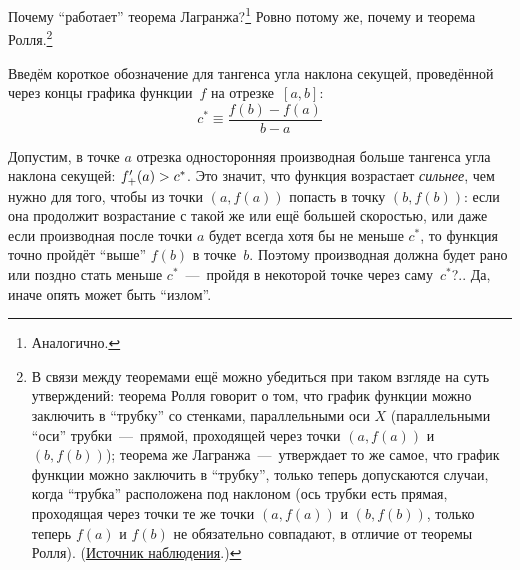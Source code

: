 \documentclass[a4paper,12pt]{article}
\begin{document}
  Почему ``работает'' теорема Лагранжа?\footnote{
    Аналогично.
  }
  Ровно потому же, почему и теорема Ролля.\footnote{
    В связи между теоремами ещё можно убедиться при таком взгляде на суть утверждений: теорема Ролля говорит о том, что график функции можно заключить в ``трубку'' со стенками, параллельными оси $X$ (параллельными ``оси'' трубки~---~прямой, проходящей через точки $(a, f(a))$ и $(b, f(b))$); теорема же Лагранжа~---~утверждает то же самое, что график функции можно заключить в ``трубку'', только теперь допускаются случаи, когда ``трубка'' расположена под наклоном (ось трубки есть прямая, проходящая через точки те же точки $(a, f(a))$ и $(b, f(b))$, только теперь $f(a)$ и $f(b)$ не обязательно совпадают, в отличие от теоремы Ролля).
    (\href{https://math.stackexchange.com/questions/459406/proof-of-the-mean-value-theorem\#comment988873_459406}{Источник наблюдения}.)
  }

  Введём короткое обозначение для тангенса угла наклона секущей, проведённой через концы графика функции~$f$ на отрезке~$[a, b]$:
  \[
    c^* \equiv \frac{f(b) - f(a)}{b - a}
  \]

  Допустим, в точке $a$ отрезка односторонняя производная больше тангенса угла наклона секущей: $f'_+(a) \hm> c^*$.
  Это значит, что функция возрастает \emph{сильнее}, чем нужно для того, чтобы из точки $(a, f(a))$ попасть в точку $(b, f(b))$: если она продолжит возрастание с такой же или ещё большей скоростью, или даже если производная после точки $a$ будет всегда хотя бы не меньше $c^*$, то функция точно пройдёт ``выше'' $f(b)$ в точке~$b$.
  Поэтому производная должна будет рано или поздно стать меньше $c^*$~---~пройдя в некоторой точке через саму~$c^*$?..
  Да, иначе опять может быть ``излом''.  %
\end{document}
